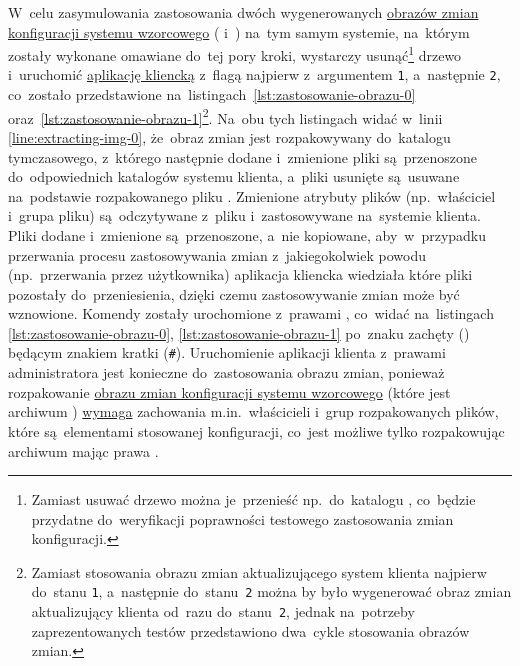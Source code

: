 \documentclass[thesis]{subfiles}
\begin{document}
W~celu zasymulowania zastosowania dwóch wygenerowanych \hyperref[sec:obraz-zmian-konfiguracji]{obrazów zmian konfiguracji systemu wzorcowego} ( i~) na~tym samym systemie, na~którym zostały wykonane omawiane do~tej pory kroki, wystarczy usunąć\footnote{Zamiast usuwać drzewo  można je~przenieść np.~do~katalogu , co~będzie przydatne do~weryfikacji poprawności testowego zastosowania zmian konfiguracji.} drzewo  i~uruchomić \hyperref[sec:cli-app]{aplikację kliencką} z~flagą  najpierw z~argumentem \texttt{1}, a~następnie \texttt{2}, co~zostało przedstawione na~listingach~\ref{lst:zastosowanie-obrazu-0} oraz~\ref{lst:zastosowanie-obrazu-1}\footnote{Zamiast stosowania obrazu zmian aktualizującego system klienta najpierw do~stanu \texttt{1}, a~następnie do~stanu~\texttt{2} można by było wygenerować obraz zmian aktualizujący klienta od~razu do~stanu~\texttt{2}, jednak na~potrzeby zaprezentowanych testów przedstawiono dwa~cykle stosowania obrazów zmian.}. Na~obu tych listingach widać w~linii \ref{line:extracting-img-0}, że~obraz zmian jest rozpakowywany do~katalogu tymczasowego, z~którego następnie dodane i~zmienione pliki są~przenoszone do~odpowiednich katalogów systemu klienta, a~pliki usunięte są~usuwane na~podstawie rozpakowanego pliku . Zmienione atrybuty plików (np.~właściciel i~grupa pliku) są~odczytywane z~pliku  i~zastosowywane na~systemie klienta. Pliki dodane i~zmienione są~przenoszone, a~nie kopiowane, aby~w~przypadku przerwania procesu zastosowywania zmian z~jakiegokolwiek powodu (np.~przerwania przez użytkownika) aplikacja kliencka wiedziała które pliki pozostały do~przeniesienia, dzięki czemu zastosowywanie zmian może być wznowione. Komendy  zostały urochomione z~prawami \superuser{}, co~widać na~listingach \ref{lst:zastosowanie-obrazu-0}, \ref{lst:zastosowanie-obrazu-1} po~znaku zachęty () będącym znakiem kratki (\texttt{\#}). Uruchomienie aplikacji klienta z~prawami administratora jest konieczne do~zastosowania obrazu zmian, ponieważ rozpakowanie \hyperref[sec:obraz-zmian-konfiguracji]{obrazu zmian konfiguracji systemu wzorcowego} (które jest archiwum \targz{}) \href{https://superuser.com/questions/838392/how-to-tar-a-directory-preserving-not-only-permissions-but-ownership-too}{wymaga} zachowania m.in.~właścicieli i~grup rozpakowanych plików, które są~elementami stosowanej konfiguracji, co~jest możliwe tylko rozpakowując archiwum mając prawa \superuser{}.
\end{document}

